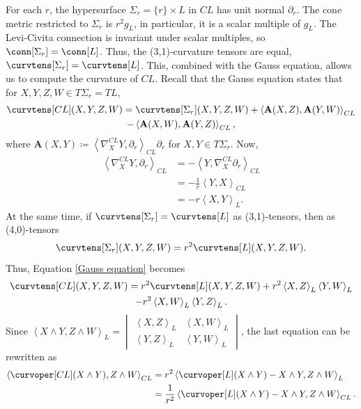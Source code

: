 \documentclass[12pt, reqno]{amsart}
\theoremstyle{plain} %
\theoremstyle{definition}
\theoremstyle{remark}
\numberwithin{equation}{section}
\begin{document}
For each \(r\), the hypersurface \(\Sigma_r=\{r\}\times L\) in \(CL\) has unit normal \(\partial_r\).
The cone metric restricted to \(\Sigma_r\) is \(r^2g_L\), in particular, it is a scalar multiple of \(g_L\). The Levi-Civita connection is invariant under scalar multiples, so \(\conn[\Sigma_r]=\conn[L]\).
Thus, the (3,1)-curvature tensors are equal, \(\curvtens[\Sigma_r]=\curvtens[L]\).
This, combined with the Gauss equation, allows us to compute the curvature of \(CL\).
Recall that the Gauss equation states that for \(X,Y,Z,W\in T\Sigma_r=TL\),
\begin{multline}\label{Gauss equation}
    \curvtens[CL](X,Y,Z,W) = \curvtens[\Sigma_r](X,Y,Z,W) + \left< \mathbf{A}(X,Z), \mathbf{A}(Y,W) \right>_{CL}\\ - \left< \mathbf{A}(X,W), \mathbf{A}(Y,Z) \right>_{CL},
\end{multline}
where \(\mathbf{A}(X,Y)\coloneqq\left< \nabla_X^{CL}Y, \partial_r \right>_{CL}\partial_r\) for \(X,Y\in T\Sigma_r\).
Now,
\begin{align*}
    \left< \nabla_X^{CL}Y,\partial_r \right>_{CL} &= -\left< Y,\nabla_X^{CL}\partial_r \right>_{CL}\\
    &= -\frac{1}{r} \left< Y,X \right> _{CL}\\
    &= -r\left< X,Y \right>_L.
\end{align*}
At the same time, if \(\curvtens[\Sigma_r]=\curvtens[L]\) as (3,1)-tensors, then as (4,0)-tensors
\begin{equation*}
    \curvtens[\Sigma_r](X,Y,Z,W)=r^2\curvtens[L](X,Y,Z,W).
\end{equation*}
Thus, Equation \eqref{Gauss equation} becomes
\begin{multline*}
    \curvtens[CL](X,Y,Z,W) = r^2\curvtens[L](X,Y,Z,W) + r^2\left< X,Z \right>_L\left< Y,W \right>_L \\
    - r^2\left< X,W \right>_L\left< Y,Z \right>_L.
\end{multline*}
Since $\left< X\wedge Y, Z\wedge W \right>_L = \begin{vmatrix}
    \left< X,Z \right>_L & \left< X,W \right>_L \\
    \left< Y,Z \right>_L & \left< Y,W \right>_L
\end{vmatrix}$, the last equation can be rewritten as
\begin{align*}
    \left< \curvoper[CL](X\wedge Y),Z\wedge W \right>_{CL} &= r^2\left< \curvoper[L](X\wedge Y) - X \wedge Y, Z\wedge W \right>_L \\
    &= \frac{1}{r^2}\left< \curvoper[L](X \wedge Y) - X \wedge Y, Z \wedge W \right>_{CL}.
\end{align*}
\end{document}
